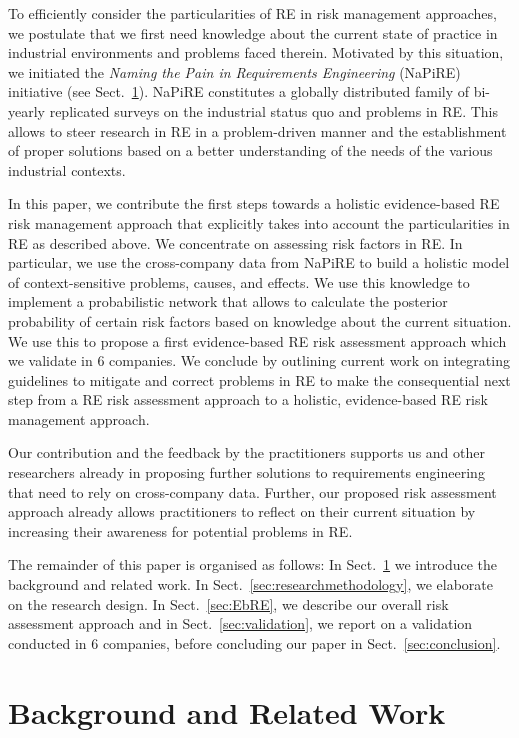 \documentclass[lnbip]{svmultln}
\begin{document}
To efficiently consider the particularities of RE in risk management approaches, we postulate that we first need knowledge about the current state of practice in industrial environments and problems faced therein. Motivated by this situation, we initiated the \emph{Naming the Pain in Requirements Engineering} (NaPiRE) initiative (see Sect.~\ref{sec:relatedwork}). NaPiRE constitutes a globally distributed family of bi-yearly replicated surveys on the industrial status quo and problems in RE. This allows to steer research in RE in a problem-driven manner and the establishment of proper solutions based on a better understanding of the needs of the various industrial contexts.

In this paper, we contribute the first steps towards a holistic evidence-based RE risk management approach that explicitly takes into account the particularities in RE as described above. We concentrate on assessing risk factors in RE. In particular, we use the cross-company data from NaPiRE to build a holistic model of context-sensitive problems, causes, and effects. We use this knowledge to implement a probabilistic network that allows to calculate the posterior probability of certain risk factors based on knowledge about the current situation. We use this to propose a first evidence-based RE risk assessment approach which we validate in 6 companies. We conclude by outlining current work on integrating guidelines to mitigate and correct problems in RE to make the consequential next step from a RE risk assessment approach to a holistic, evidence-based RE risk management approach. 

Our contribution and the feedback by the practitioners supports us and other researchers already in proposing further solutions to requirements engineering that need to rely on cross-company data. Further, our proposed risk assessment approach already allows practitioners to reflect on their current situation by increasing their awareness for potential problems in RE.

The remainder of this paper is organised as follows: In Sect.~\ref{sec:relatedwork} we introduce the background and related work. In Sect.~\ref{sec:researchmethodology}, we elaborate on the research design. In Sect.~\ref{sec:EbRE}, we describe our overall risk assessment approach and in Sect.~\ref{sec:validation}, we report on a validation conducted in 6 companies, before concluding our paper in Sect.~\ref{sec:conclusion}.


\section{Background and Related Work}
\label{sec:relatedwork}
\end{document}
